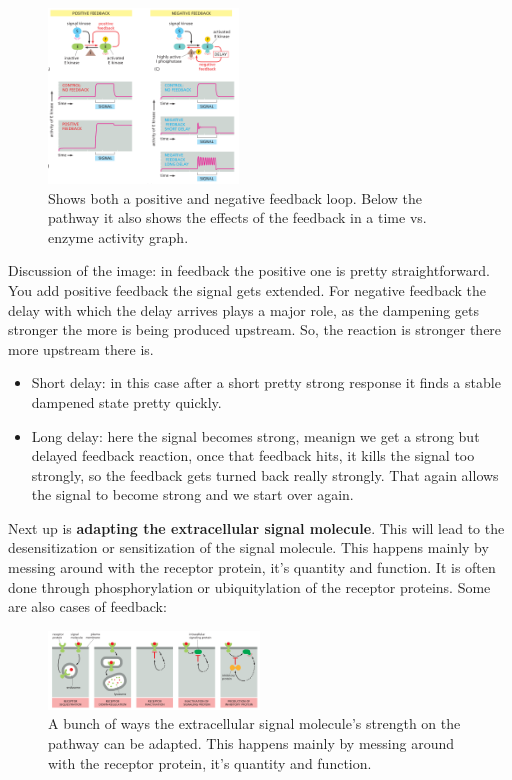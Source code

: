 \documentclass[../main.tex]{subfiles}
\begin{document}
\begin{figure}[H]
	\centering
	\includegraphics[width=0.45\textwidth]{reg_delay}
	\caption{Shows both a positive and negative feedback loop. Below the pathway it also shows the effects of the feedback in a time vs. enzyme activity graph.}
\end{figure}
Discussion of the image: in feedback the positive one is pretty straightforward. You add positive feedback the signal gets extended. For negative feedback the delay with which the delay arrives plays a major role, as the dampening gets stronger the more is being produced upstream. So, the reaction is stronger there more upstream there is.
\begin{itemize}
	\item Short delay: in this case after a short pretty strong response it finds a stable dampened state pretty quickly.
	\item Long delay: here the signal becomes strong, meanign we get a strong but delayed feedback reaction, once that feedback hits, it kills the signal too strongly, so the feedback gets turned back really strongly. That again allows the signal to become strong and we start over again. \\
\end{itemize}

Next up is \textbf{adapting the extracellular signal molecule}. This will lead to the desensitization or sensitization of the signal molecule. This happens mainly by messing around with the receptor protein, it's quantity and function. It is often done through phosphorylation or ubiquitylation of the receptor proteins. Some are also cases of feedback:

\begin{figure}[H]
	\centering
	\includegraphics[width=0.5\textwidth]{reg_ext}
	\caption{A bunch of ways the extracellular signal molecule's strength on the pathway can be adapted. This happens mainly by messing around with the receptor protein, it's quantity and function.}
\end{figure}
\end{document}
